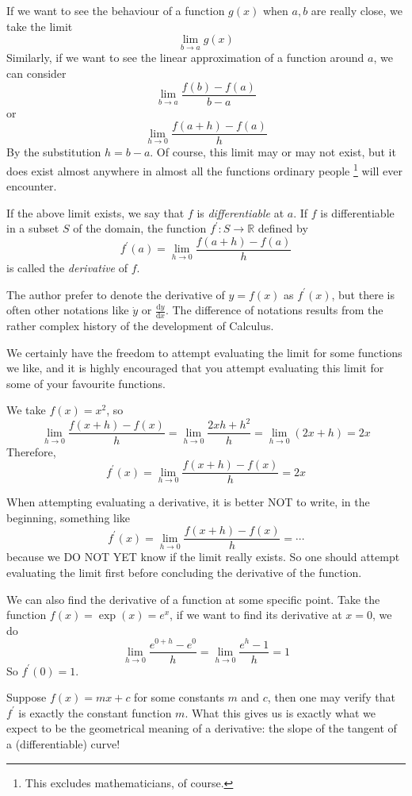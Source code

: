 If we want to see the behaviour of a function $g(x)$ when $a,b$ are really close, we take the limit
$$\lim_{b\to a}g(x)$$
Similarly, if we want to see the linear approximation of a function around $a$, we can consider 
$$\lim_{b\to a}\frac{f(b)-f(a)}{b-a}$$
or
$$\lim_{h\to 0}\frac{f(a+h)-f(a)}{h}$$
By the substitution $h=b-a$. Of course, this limit may or may not exist, but it does exist almost anywhere in almost all the functions ordinary people
\footnote{This excludes mathematicians, of course.}
will ever encounter.
\begin{definition}
    If the above limit exists, we say that $f$ is \textit{differentiable} at $a$.
    If $f$ is differentiable in a subset $S$ of the domain, the function $f^\prime:S\to\mathbb R$ defined by 
    $$f^\prime(a)=\lim_{h\to 0}\frac{f(a+h)-f(a)}{h}$$
    is called the \textit{derivative} of $f$.
\end{definition}
\begin{remark}
    The author prefer to denote the derivative of $y=f(x)$ as $f^\prime(x)$, but there is often other notations like $\dot{y}$ or $\frac{\mathrm dy}{\mathrm dx}$.
    The difference of notations results from the rather complex history of the development of Calculus.
\end{remark}
We certainly have the freedom to attempt evaluating the limit for some functions we like, and it is highly encouraged that you attempt evaluating this limit for some of your favourite functions.
\begin{example}
    We take $f(x)=x^2$, so
    $$\lim_{h\to0}\frac{f(x+h)-f(x)}{h}=\lim_{h\to0}\frac{2xh+h^2}{h}=\lim_{h\to0}(2x+h)=2x$$
    Therefore,
    $$f^\prime(x)=\lim_{h\to0}\frac{f(x+h)-f(x)}{h}=2x$$
\end{example}
\begin{remark}
    When attempting evaluating a derivative, it is better NOT to write, in the beginning, something like
    $$f^\prime(x)=\lim_{h\to0}\frac{f(x+h)-f(x)}{h}=\cdots$$
    because we DO NOT YET know if the limit really exists. So one should attempt evaluating the limit first before concluding the derivative of the function.
\end{remark}
\begin{example}
    We can also find the derivative of a function at some specific point. Take the function $f(x)=\exp(x)=e^x$, if we want to find its derivative at $x=0$, we do
    $$\lim_{h\to0}\frac{e^{0+h}-e^0}{h}=\lim_{h\to0}\frac{e^h-1}{h}=1$$
    So $f^\prime(0)=1$.
\end{example}
Suppose $f(x)=mx+c$ for some constants $m$ and $c$, then one may verify that $f^\prime$ is exactly the constant function $m$. What this gives us is exactly what we expect to be the geometrical meaning of a derivative: the slope of the tangent of a (differentiable) curve!